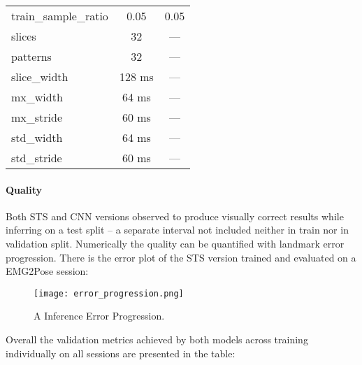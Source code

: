 {\begin{longtable}{l|c|c}
train\_sample\_ratio           & 0.05         & 0.05         \\
slices                         & 32           & ---          \\
patterns                       & 32           & ---          \\
slice\_width                   & 128 ms       & ---          \\
mx\_width                      & 64 ms        & ---          \\
mx\_stride                     & 60 ms        & ---          \\
std\_width                     & 64 ms        & ---          \\
std\_stride                    & 60 ms        & ---          \\
\hline
\end{longtable}
}

\paragraph{Quality}
Both STS and CNN versions observed to produce visually correct results while inferring on a test split -- a separate interval not included neither in train nor in validation split. Numerically the quality can be quantified with landmark error progression. There is the error plot of the STS version trained and evaluated on a EMG2Pose session:

\begin{figure}[H]
    \centering
    \texttt{[image: error\_progression.png]}
    \caption{A Inference Error Progression.}
    \label{fig:error_progression}
\end{figure}

Overall the validation metrics achieved by both models across training individually on all sessions are presented in the table:

